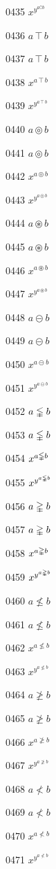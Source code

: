 \documentclass{article}
\begin{document}
0435 $x^{y^{a\complement b}}$\par
0436 $a\intercal b$\par
0437 $\displaystyle a\intercal b$\par
0438 $x^{a\intercal b}$\par
0439 $x^{y^{a\intercal b}}$\par
0440 $a\circledcirc b$\par
0441 $\displaystyle a\circledcirc b$\par
0442 $x^{a\circledcirc b}$\par
0443 $x^{y^{a\circledcirc b}}$\par
0444 $a\circledast b$\par
0445 $\displaystyle a\circledast b$\par
0446 $x^{a\circledast b}$\par
0447 $x^{y^{a\circledast b}}$\par
0448 $a\circleddash b$\par
0449 $\displaystyle a\circleddash b$\par
0450 $x^{a\circleddash b}$\par
0451 $x^{y^{a\circleddash b}}$\par
0452 $a\lvertneqq b$\par
0453 $\displaystyle a\lvertneqq b$\par
0454 $x^{a\lvertneqq b}$\par
0455 $x^{y^{a\lvertneqq b}}$\par
0456 $a\gvertneqq b$\par
0457 $\displaystyle a\gvertneqq b$\par
0458 $x^{a\gvertneqq b}$\par
0459 $x^{y^{a\gvertneqq b}}$\par
0460 $a\nleq b$\par
0461 $\displaystyle a\nleq b$\par
0462 $x^{a\nleq b}$\par
0463 $x^{y^{a\nleq b}}$\par
0464 $a\ngeq b$\par
0465 $\displaystyle a\ngeq b$\par
0466 $x^{a\ngeq b}$\par
0467 $x^{y^{a\ngeq b}}$\par
0468 $a\nless b$\par
0469 $\displaystyle a\nless b$\par
0470 $x^{a\nless b}$\par
0471 $x^{y^{a\nless b}}$\par
\end{document}
